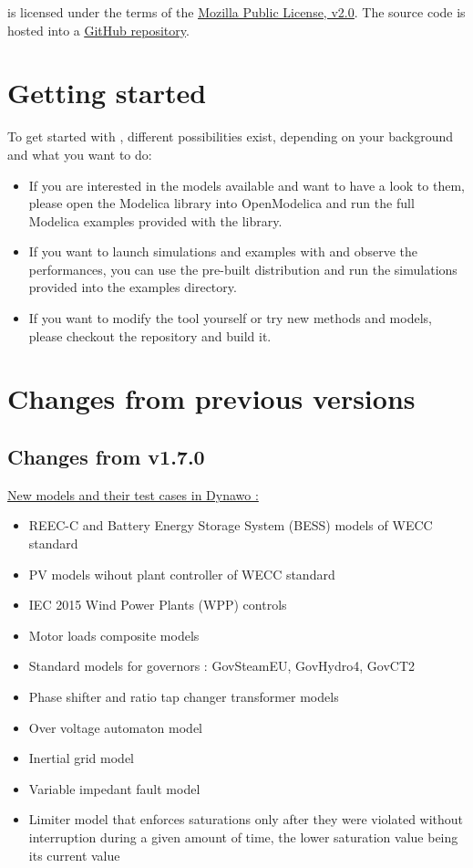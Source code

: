 \documentclass[a4paper, 12pt]{report}
\begin{document}
\Dynawo is licensed under the terms of the \href{http://mozilla.org/MPL/2.0}{\underline{Mozilla Public License, v2.0}}.
The source code is hosted into a \href{https://github.com/dynawo/dynawo} {\underline{GitHub repository}}. \\

\section{Getting started}

To get started with \Dynawo , different possibilities exist, depending on your background and what you want to do:
\begin{itemize}
\item If you are interested in the models available and want to have a look to them, please open the \Dynawo Modelica library into OpenModelica and run the full Modelica examples provided with the library.
\item If you want to launch simulations and examples with \Dynawo and observe the performances, you can use the pre-built distribution and run the simulations provided into the examples directory.
\item If you want to modify the tool yourself or try new methods and models, please checkout the repository and build it.
\end{itemize}

\section{Changes from previous versions}
\subsection{Changes from v1.7.0}

\underline{New models and their test cases in Dynawo  :}
\begin{itemize}
\item REEC-C and Battery Energy Storage System (BESS) models of WECC standard
\item PV models wihout plant controller of WECC standard
\item IEC 2015 Wind Power Plants (WPP) controls
\item Motor loads composite models
\item Standard models for governors : GovSteamEU, GovHydro4, GovCT2
\item Phase shifter and ratio tap changer transformer models
\item Over voltage automaton model
\item Inertial grid model
\item Variable impedant fault model
\item Limiter model that enforces saturations only after they were violated without interruption during a given amount of time, the lower saturation value being its current value
\end{itemize}
\end{document}
